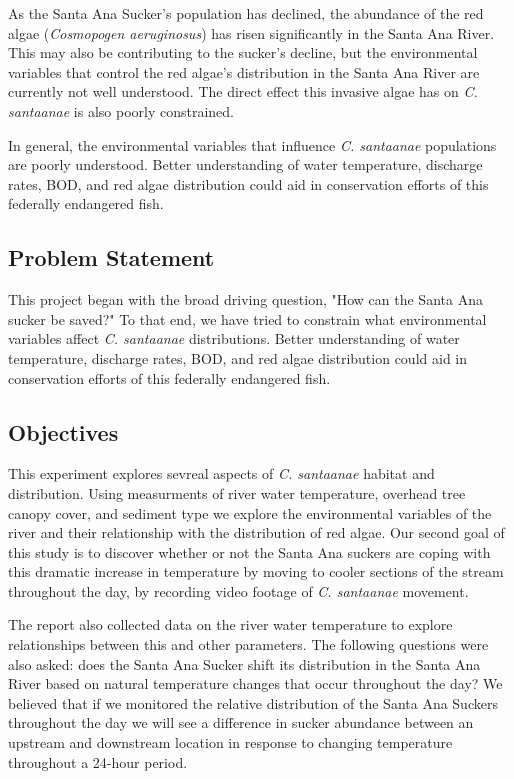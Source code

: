 \documentclass{article}\usepackage[]{graphicx}\usepackage[]{color}
\begin{document}
As the Santa Ana Sucker's population has declined, the abundance of the red algae (\emph{Cosmopogen aeruginosus}) has risen significantly in the Santa Ana River. This may also be contributing to the sucker's decline, but the environmental variables that control the red algae's distribution in the Santa Ana River are currently not well understood. The direct effect this invasive algae has on \emph{C. santaanae} is also poorly constrained. 

In general, the environmental variables that influence \emph{C. santaanae} populations are poorly understood. Better understanding of water temperature, discharge rates, BOD, and red algae distribution could aid in conservation efforts of this federally endangered fish. 


\subsection{Problem Statement}


This project began with the broad driving question, "How can the Santa Ana sucker be saved?" To that end, we have tried to constrain what environmental variables affect \emph{C. santaanae} distributions. Better understanding of water temperature, discharge rates, BOD, and red algae distribution could aid in conservation efforts of this federally endangered fish.


\subsection{Objectives} 

This experiment explores sevreal aspects of \emph{C. santaanae} habitat and distribution. Using measurments of river water temperature, overhead tree canopy cover, and sediment type we explore the environmental variables of the river and their relationship with the distribution of red algae. Our second goal of this study is to discover whether or not the Santa Ana suckers are coping with this dramatic increase in temperature by moving to cooler sections of the stream throughout the day, by recording video footage of \emph{C. santaanae} movement. 

The report also collected data on the river water temperature to explore relationships between this and other parameters. The following questions were also asked: does the Santa Ana Sucker shift its distribution in the Santa Ana River based on natural temperature changes that occur throughout the day? We believed that if we monitored the relative distribution of the Santa Ana Suckers throughout the day we will see a difference in sucker abundance between an upstream and downstream location in response to changing temperature throughout a 24-hour period. 
\end{document}
